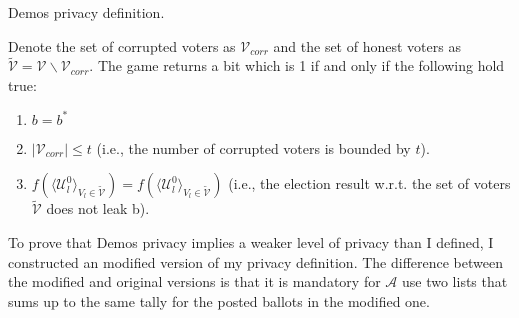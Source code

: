 \begin{definition}{ Demos privacy definition.}
\begin{enumerate}
\end{enumerate}
Denote the set of corrupted voters as $\mathcal{V}_{corr}$ and the set of honest voters as $\tilde{\mathcal{V}}= \mathcal{V} \backslash \mathcal{V}_{corr}$. The game returns a bit which is 1 if and only if the following hold true:
\begin{enumerate}
 \item $b = b^*$
 \item $|\mathcal{V}_{corr}| \leq t$ (i.e., the number of corrupted voters is bounded by $t$).
 \item $f(\langle \mathcal{U}^0_l \rangle _{V_l \in \tilde{\mathcal{V}}} ) = f(\langle \mathcal{U}^0_l \rangle _{V_l \in \tilde{\mathcal{V}}})$ (i.e., the election result w.r.t. the set of voters  $\tilde{\mathcal{V}}$ does not leak b).
\end{enumerate} 
\end{definition}
To prove that Demos privacy implies a weaker level of privacy than I defined, I constructed an modified version of my privacy definition. The difference between the modified and original versions is that it is mandatory for  $\mathcal{A}$ use two lists that sums up to the same tally for the posted ballots in the modified one.\\
 
